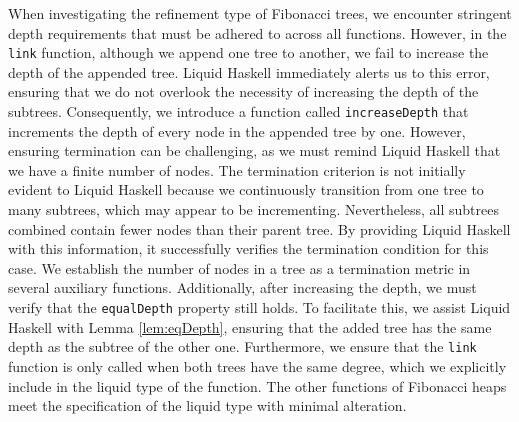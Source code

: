\documentclass{clmthesis}
\begin{document}
When investigating the refinement type of Fibonacci trees, we encounter stringent depth requirements that must be adhered to across all functions. However, in the \texttt{link} function, although we append one tree to another, we fail to increase the depth of the appended tree. Liquid Haskell immediately alerts us to this error, ensuring that we do not overlook the necessity of increasing the depth of the subtrees. Consequently, we introduce a function called \texttt{increaseDepth} that increments the depth of every node in the appended tree by one. However, ensuring termination can be challenging, as we must remind Liquid Haskell that we have a finite number of nodes. The termination criterion is not initially evident to Liquid Haskell because we continuously transition from one tree to many subtrees, which may appear to be incrementing. Nevertheless, all subtrees combined contain fewer nodes than their parent tree. By providing Liquid Haskell with this information, it successfully verifies the termination condition for this case. We establish the number of nodes in a tree as a termination metric in several auxiliary functions. Additionally, after increasing the depth, we must verify that the \texttt{equalDepth} property still holds. To facilitate this, we assist Liquid Haskell with Lemma \ref{lem:eqDepth}, ensuring that the added tree has the same depth as the subtree of the other one. Furthermore, we ensure that the \texttt{link} function is only called when both trees have the same degree, which we explicitly include in the liquid type of the function. The other functions of Fibonacci heaps meet the specification of the liquid type with minimal alteration.

\end{document}
